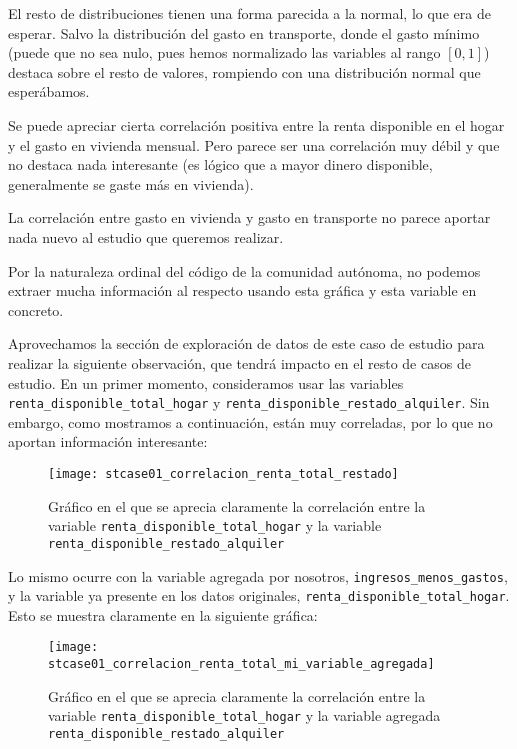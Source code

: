 \documentclass[11pt]{article}
\begin{document}
El resto de distribuciones tienen una forma parecida a la normal, lo que era de esperar. Salvo la distribución del gasto en transporte, donde el gasto mínimo (puede que no sea nulo, pues hemos normalizado las variables al rango $[0, 1]$) destaca sobre el resto de valores, rompiendo con una distribución normal que esperábamos.

Se puede apreciar cierta correlación positiva entre la renta disponible en el hogar y el gasto en vivienda mensual. Pero parece ser una correlación muy débil y que no destaca nada interesante (es lógico que a mayor dinero disponible, generalmente se gaste más en vivienda).

La correlación entre gasto en vivienda y gasto en transporte no parece aportar nada nuevo al estudio que queremos realizar.

Por la naturaleza ordinal del código de la comunidad autónoma, no podemos extraer mucha información al respecto usando esta gráfica y esta variable en concreto.


Aprovechamos la sección de exploración de datos de este caso de estudio para realizar la siguiente observación, que tendrá impacto en el resto de casos de estudio. En un primer momento, consideramos usar las variables \lstinline{renta_disponible_total_hogar} y \lstinline{renta_disponible_restado_alquiler}. Sin embargo, como mostramos a continuación, están muy correladas, por lo que no aportan información interesante:

\begin{figure}[H]
    \centering

    \texttt{[image: stcase01\_correlacion\_renta\_total\_restado]}
    \caption{Gráfico en el que se aprecia claramente la correlación entre la variable \lstinline{renta_disponible_total_hogar} y la variable \lstinline{renta_disponible_restado_alquiler}}
\end{figure}

Lo mismo ocurre con la variable agregada por nosotros, \lstinline{ingresos_menos_gastos}, y la variable ya presente en los datos originales, \lstinline{renta_disponible_total_hogar}. Esto se muestra claramente en la siguiente gráfica:

\begin{figure}[H]
    \centering

    \texttt{[image: stcase01\_correlacion\_renta\_total\_mi\_variable\_agregada]}
    \caption{Gráfico en el que se aprecia claramente la correlación entre la variable \lstinline{renta_disponible_total_hogar} y la variable agregada \lstinline{renta_disponible_restado_alquiler}}
\end{figure}
\end{document}
